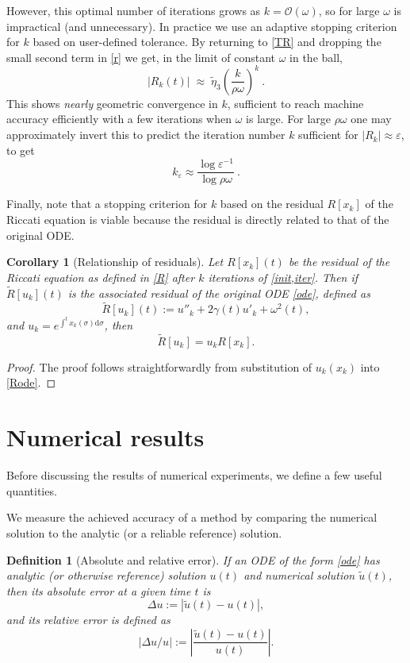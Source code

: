 \documentclass[10pt]{article}
\newcommand{\be}{\begin{equation}}
\newcommand{\ee}{\end{equation}}
\newcommand{\bigO}{{\mathcal O}}
\newtheorem{cor}[thm]{Corollary}
\newtheorem{defn}[thm]{Definition}
\newcommand{\om}{\omega}
\newcommand{\te}{\tilde\eta}
\begin{document}
However, this optimal number of iterations grows as $k = \bigO(\om)$,
so for large $\om$ is impractical (and unnecessary).
In practice we use an adaptive stopping criterion for $k$ based
on user-defined tolerance.
By returning to \cref{TR} and dropping the small second term
in \cref{r} we get, in the limit of constant $\om$ in the ball,
$$
|R_k(t)| \; \approx \; \te_3 \left( \frac{k}{\rho\om}\right)^k~.
$$
This shows \textit{nearly} geometric convergence in $k$,
sufficient to reach machine accuracy efficiently with a few iterations
when $\om$ is large.
For large $\rho\om$ one may approximately invert this to predict the iteration number $k$ sufficient for $|R_k| \approx \varepsilon$, to get
$$
k_\varepsilon \approx \frac{\log \varepsilon^{-1}}{\log \rho\om}~.
$$

Finally, note that a stopping criterion for $k$ based on the residual $R[x_k]$ of the Riccati equation is viable because the residual is directly related to that of the original ODE.
\begin{cor}[Relationship of residuals]\label{residualu}
    Let $R[x_k](t)$ be the residual of the Riccati equation as defined in
    \cref{R} after $k$ iterations of \cref{init,iter}. Then if
    $\tilde{R}[u_k](t)$ is the associated residual of the original ODE
    \cref{ode}, defined as
    \be\label{Rode}
    \tilde{R}[u_k](t) := u''_k + 2\gamma(t)u'_k + \omega^2(t),
    \ee
    and $u_k = e^{\int^t x_k(\sigma)\mathrm{d}\sigma}$, then
    \be
    \tilde{R}[u_k] = u_k R[x_k].
    \ee
\end{cor}
\begin{proof}
    The proof follows straightforwardly from substitution of $u_k(x_k)$ into \cref{Rode}.
\end{proof}


\section{Numerical results \label{numresults}}

Before discussing the results of numerical experiments, we define a few useful quantities. 

We measure the achieved accuracy of a method by comparing the numerical
solution to the analytic (or a reliable reference) solution.
\begin{defn}[Absolute and relative error]\label{deltau}
    If an ODE of the form \cref{ode} has analytic (or otherwise reference) solution $u(t)$ and 
    numerical solution $\tilde{u}(t)$, then its absolute error at a given time $t$ is
    \be
    \Delta u := \left| \tilde{u}(t) - u(t)\right|,
    \ee
    and its relative error is defined as
    \be
    \left| \Delta u/u \right| := \left| \frac{\tilde{u}(t) - u(t)}{u(t)}\right|.
    \ee
\end{defn}
\end{document}
